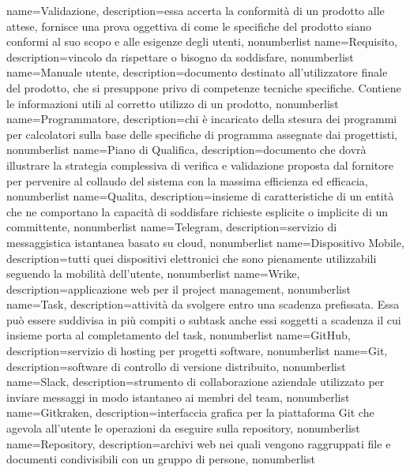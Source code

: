 {
name={Validazione},
description={essa accerta la conformità di un prodotto alle attese, fornisce una prova oggettiva di come le specifiche del prodotto siano conformi al suo scopo e alle esigenze degli utenti},
nonumberlist 
}
{
name={Requisito},
description={vincolo da rispettare o bisogno da soddisfare},
nonumberlist 
}
{
name={Manuale utente},
description={documento destinato all'utilizzatore finale del prodotto, che si presuppone privo di competenze tecniche specifiche. Contiene le informazioni utili al corretto utilizzo di un prodotto},
nonumberlist 
}
{
name={Programmatore},
description={chi è incaricato della stesura dei programmi per calcolatori sulla base delle specifiche di programma assegnate dai progettisti},
nonumberlist 
}
{
name={Piano di Qualifica},
description={documento che dovrà illustrare la strategia complessiva di verifica e validazione proposta dal fornitore per pervenire al collaudo del sistema con la massima efficienza ed efficacia},
nonumberlist 
}
{
name={Qualita},
description={insieme di caratteristiche di un entità che ne comportano la capacità di soddisfare richieste esplicite o implicite di un committente},
nonumberlist 
}
{
name={Telegram},
description={servizio di messaggistica istantanea basato su cloud},
nonumberlist 
}
{
name={Dispositivo Mobile},
description={tutti quei dispositivi elettronici che sono pienamente utilizzabili seguendo la mobilità dell'utente},
nonumberlist 
}
{
name={Wrike},
description={applicazione web per il project management},
nonumberlist 
}
{
name={Task},
description={attività da svolgere entro una scadenza prefissata. Essa può essere suddivisa in più compiti o subtask anche essi soggetti a scadenza il cui insieme porta al completamento del task},
nonumberlist 
}
{
name={GitHub},
description={servizio di hosting per progetti software},
nonumberlist 
}
{
name={Git},
description={software di controllo di versione distribuito},
nonumberlist
}
{
name={Slack},
description={strumento di collaborazione aziendale utilizzato per inviare messaggi in modo istantaneo ai membri del team},
nonumberlist
}
{
name={Gitkraken},
description={interfaccia grafica per la piattaforma Git che agevola all'utente le operazioni da eseguire sulla repository},
nonumberlist
}
{
name={Repository},
description={archivi web nei quali vengono raggruppati file e documenti condivisibili con un gruppo di persone},
nonumberlist
}

